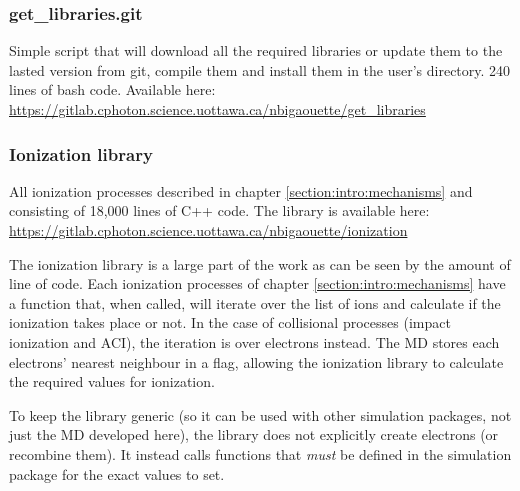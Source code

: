 \subsubsection{get\_libraries.git} \label{section:tools:libraries:getlibraries}

Simple script that will download all the required libraries or
update them to the lasted version from git, compile them and install them in the
user's directory. 240 lines of bash code.
Available here:\\
\url{https://gitlab.cphoton.science.uottawa.ca/nbigaouette/get_libraries}



\subsubsection{Ionization library}
\label{section:tools:libraries:ionization}

All ionization processes described in chapter
\ref{section:intro:mechanisms} and consisting of 18,000 lines of C++ code.
The library is available here:\\
\url{https://gitlab.cphoton.science.uottawa.ca/nbigaouette/ionization}

The ionization library is a large part of the work as can be seen by the amount
of line of code. Each ionization processes of chapter
\ref{section:intro:mechanisms} have a function that, when called, will iterate
over the list of ions and calculate if the ionization takes place or not. In the
case of collisional processes (impact ionization and ACI), the iteration is over
electrons instead. The MD stores each electrons' nearest neighbour in a flag,
allowing the ionization library to calculate the required values for ionization.

To keep the library generic (so it can be used with other simulation packages,
not just the MD developed here), the library does not explicitly create
electrons (or recombine them). It instead calls functions that \textit{must}
be defined in the simulation package for the exact values to set.


